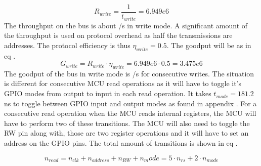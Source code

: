 \begin{equation}\label{eq:7_2_1_Write_ThroughPut}
    R_{write} = \frac{1}{t_{write}} = 6.949e6 
\end{equation}
The throughput on the bus is about /s in write mode. A significant amount of the throughput is used on protocol overhead as half the transmissions are addresses. The protocol efficiency is thus $\eta_{write} = 0.5$. The goodput will be as in eq .
\begin{equation}\label{eq:7_2_1_Write_ThroughPut2}
    G_{write} = R_{write}\cdot \eta_{write} = 6.949e6 \cdot 0.5 = 3.475e6 
\end{equation}
The goodput of the bus in write mode is /s for consecutive writes. The situation is different for consecutive MCU read operations as it will have to toggle it's GPIO modes from output to input in each read operation. It takes $t_{mode} = 181.2$ns to toggle between GPIO input and output modes as found in appendix . For a consecutive read operation when the MCU reads internal registers, the MCU will have to perform two of these transitions. The MCU will also need to toggle the RW pin along with, those are two register operations and it will have to set an address on the GPIO pins. The total amount of transitions is shown in eq .

\begin{equation}\label{eq:7_2_1_Read_Register1}
    n_{read} = n_{clk} + n_{address} + n_{RW} + {n_mode} = 5 \cdot n_{rs} + 2 \cdot n_{mode} 
\end{equation}

